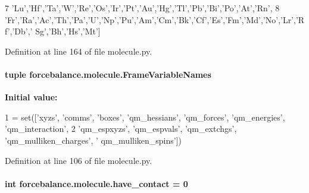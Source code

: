 \begin{DoxyCode}
7             \textcolor{stringliteral}{'Lu'},\textcolor{stringliteral}{'Hf'},\textcolor{stringliteral}{'Ta'},\textcolor{stringliteral}{'W'},\textcolor{stringliteral}{'Re'},\textcolor{stringliteral}{'Os'},\textcolor{stringliteral}{'Ir'},\textcolor{stringliteral}{'Pt'},\textcolor{stringliteral}{'Au'},\textcolor{stringliteral}{'Hg'},\textcolor{stringliteral}{'Tl'},\textcolor{stringliteral}{'Pb'},\textcolor{stringliteral}{'Bi'},\textcolor{stringliteral}{'Po'},\textcolor{stringliteral}{'At'},\textcolor{stringliteral}{'Rn'},
8             \textcolor{stringliteral}{'Fr'},\textcolor{stringliteral}{'Ra'},\textcolor{stringliteral}{'Ac'},\textcolor{stringliteral}{'Th'},\textcolor{stringliteral}{'Pa'},\textcolor{stringliteral}{'}\textcolor{stringliteral}{U','}Np','Pu','Am','Cm','Bk','Cf','Es','Fm','Md','No','Lr','Rf','Db','
      Sg','Bh','Hs','Mt']
\end{DoxyCode}


Definition at line 164 of file molecule.\-py.

\hypertarget{namespaceforcebalance_1_1molecule_a0044fa397e0923635a8b3e9625aa70f7}{
\paragraph[{Frame\-Variable\-Names}]{\setlength{\rightskip}{0pt plus 5cm}tuple forcebalance.\-molecule.\-Frame\-Variable\-Names}}\label{namespaceforcebalance_1_1molecule_a0044fa397e0923635a8b3e9625aa70f7}
{\bfseries Initial value\-:}
\begin{DoxyCode}
1 = set([\textcolor{stringliteral}{'xyzs'}, \textcolor{stringliteral}{'comms'}, \textcolor{stringliteral}{'boxes'}, \textcolor{stringliteral}{'qm\_hessians'}, \textcolor{stringliteral}{'qm\_forces'}, \textcolor{stringliteral}{'qm\_energies'}, \textcolor{stringliteral}{'qm\_interaction'}, 
2                           \textcolor{stringliteral}{'qm\_espxyzs'}, \textcolor{stringliteral}{'qm\_espvals'}, \textcolor{stringliteral}{'qm\_extchgs'}, \textcolor{stringliteral}{'qm\_mulliken\_charges'}, \textcolor{stringliteral}{'
      qm\_mulliken\_spins'}])
\end{DoxyCode}


Definition at line 106 of file molecule.\-py.

\hypertarget{namespaceforcebalance_1_1molecule_a56640bd990a2e85f43fdba20b61cb8b8}{
\paragraph[{have\-\_\-contact}]{\setlength{\rightskip}{0pt plus 5cm}int forcebalance.\-molecule.\-have\-\_\-contact = 0}}\label{namespaceforcebalance_1_1molecule_a56640bd990a2e85f43fdba20b61cb8b8}


